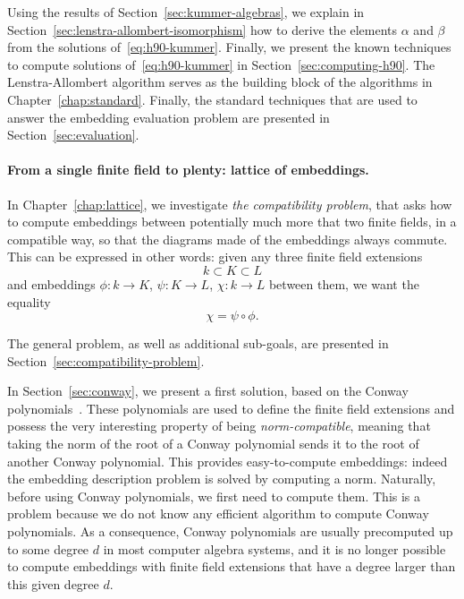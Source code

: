 Using the results of Section~\ref{sec:kummer-algebras}, we explain in
Section~\ref{sec:lenstra-allombert-isomorphism} how to derive the elements
$\alpha$ and $\beta$ from the solutions of~\eqref{eq:h90-kummer}. Finally, we
present the known techniques to compute solutions of~\eqref{eq:h90-kummer} in
Section~\ref{sec:computing-h90}. The Lenstra-Allombert algorithm serves as the
building block of the algorithms in Chapter~\ref{chap:standard}. Finally, the
standard techniques that are used to answer the embedding evaluation problem are
presented in Section~\ref{sec:evaluation}.

\paragraph{From a single finite field to plenty: lattice of embeddings.}
In Chapter~\ref{chap:lattice}, we investigate \emph{the compatibility problem},
that asks how to compute embeddings between potentially much more that two
finite fields, in a compatible way, \ie so that the diagrams made of the embeddings
always commute. This can be expressed in other words: given any three finite
field extensions 
\[
  k \subset K\subset L
\]
and embeddings $\phi:k\to K$, $\psi:K\to L$, $\chi:k\to L$ between them, we want
the equality
\[
  \chi=\psi\circ\phi.
\]
\begin{center}
\end{center}
The general problem, as well as additional sub-goals, are presented in
Section~\ref{sec:compatibility-problem}.

In Section~\ref{sec:conway}, we present a first solution, based on the Conway
polynomials~\cite{Parker90, Scheerhorn92}. These polynomials are used to define
the finite field extensions and possess the very interesting property of being
\emph{norm-compatible}, meaning that taking the norm of the root of a Conway
polynomial sends it to the root of another Conway polynomial. This provides
easy-to-compute embeddings: indeed the embedding description problem is solved
by computing a norm. Naturally, before using Conway polynomials, we first need
to compute them. This is a problem because we do not know any efficient
algorithm to compute Conway polynomials. As a consequence, Conway polynomials
are usually precomputed up to some degree $d$ in most computer algebra systems,
and it is no longer possible to compute embeddings with finite field extensions
that have a degree larger than this given degree $d$.

